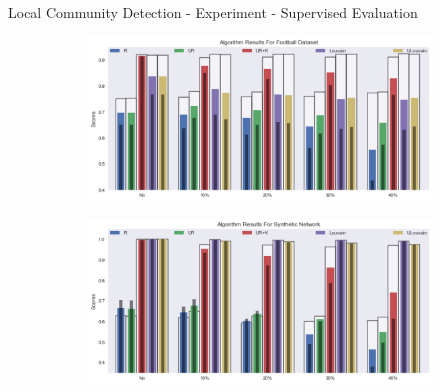 \documentclass[9pt]{beamer}
\begin{document}
\begin{frame}{Local Community Detection - Experiment - Supervised Evaluation}


      \begin{figure}
      \centering

      \begin{subfigure}[b]{\textwidth}
         \includegraphics[scale = 0.12]{image5.jpeg}
         \centering
      \end{subfigure}

	\begin{subfigure}[b]{\textwidth}
         \includegraphics[scale = 0.12]{image6.jpeg}
         \centering
      \end{subfigure}

    \label{cl_enron}
    \end{figure}


\end{frame}
\end{document}
